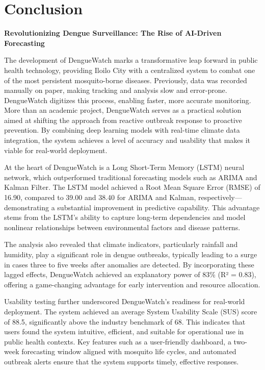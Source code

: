\chapter{Conclusion}
\textbf{Revolutionizing Dengue Surveillance: The Rise of AI-Driven Forecasting}

The development of DengueWatch marks a transformative leap forward in public health technology, providing Iloilo City with a centralized system to combat one of the most persistent mosquito-borne diseases. Previously, data was recorded manually on paper, making tracking and analysis slow and error-prone. DengueWatch digitizes this process, enabling faster, more accurate monitoring. More than an academic project, DengueWatch serves as a practical solution aimed at shifting the approach from reactive outbreak response to proactive prevention. By combining deep learning models with real-time climate data integration, the system achieves a level of accuracy and usability that makes it viable for real-world deployment.

At the heart of DengueWatch is a Long Short-Term Memory (LSTM) neural network, which outperformed traditional forecasting models such as ARIMA and Kalman Filter. The LSTM model achieved a Root Mean Square Error (RMSE) of 16.90, compared to 39.00 and 38.40 for ARIMA and Kalman, respectively—demonstrating a substantial improvement in predictive capability. This advantage stems from the LSTM's ability to capture long-term dependencies and model nonlinear relationships between environmental factors and disease patterns.

The analysis also revealed that climate indicators, particularly rainfall and humidity, play a significant role in dengue outbreaks, typically leading to a surge in cases three to five weeks after anomalies are detected. By incorporating these lagged effects, DengueWatch achieved an explanatory power of 83\% (R² = 0.83), offering a game-changing advantage for early intervention and resource allocation.

Usability testing further underscored DengueWatch’s readiness for real-world deployment. The system achieved an average System Usability Scale (SUS) score of 88.5, significantly above the industry benchmark of 68. This indicates that users found the system intuitive, efficient, and suitable for operational use in public health contexts. Key features such as a user-friendly dashboard, a two-week forecasting window aligned with mosquito life cycles, and automated outbreak alerts ensure that the system supports timely, effective responses.

